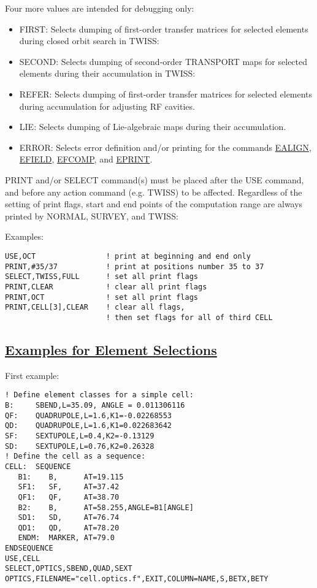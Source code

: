 Four more values are intended for debugging only: 
\begin{itemize}
   \item FIRST: Selects dumping of first-order transfer matrices for
     selected elements during closed orbit search in TWISS:  
   \item SECOND: Selects dumping of second-order TRANSPORT maps for
     selected elements during their accumulation in TWISS:  
   \item REFER: Selects dumping of first-order transfer matrices for
     selected elements during accumulation for adjusting RF cavities.  
   \item LIE: Selects dumping of Lie-algebraic maps during their accumulation. 
   \item ERROR: Selects error definition and/or printing for the
     commands \href{error_align.html}{EALIGN},
     \href{error_field.html}{EFIELD},  \href{error_field.html}{EFCOMP},
     and  \href{error_print.html}{EPRINT}.  
\end{itemize} 

PRINT and/or SELECT command(s) must be placed after the USE command, and
before any action command (e.g. TWISS) to be affected. Regardless of the
setting of print flags, start and end points of the computation range
are always printed by NORMAL, SURVEY, and TWISS:  

 Examples: 
\begin{verbatim}
USE,OCT                ! print at beginning and end only
PRINT,#35/37           ! print at positions number 35 to 37
SELECT,TWISS,FULL      ! set all print flags
PRINT,CLEAR            ! clear all print flags
PRINT,OCT              ! set all print flags
PRINT,CELL[3],CLEAR    ! clear all flags,
                       ! then set flags for all of third CELL
\end{verbatim}

\subsection{\href{example}{Examples for Element Selections}} 

First example: 
\begin{verbatim}
! Define element classes for a simple cell:
B:     SBEND,L=35.09, ANGLE = 0.011306116
QF:    QUADRUPOLE,L=1.6,K1=-0.02268553
QD:    QUADRUPOLE,L=1.6,K1=0.022683642
SF:    SEXTUPOLE,L=0.4,K2=-0.13129
SD:    SEXTUPOLE,L=0.76,K2=0.26328
! Define the cell as a sequence:
CELL:  SEQUENCE
   B1:    B,      AT=19.115
   SF1:   SF,     AT=37.42
   QF1:   QF,     AT=38.70
   B2:    B,      AT=58.255,ANGLE=B1[ANGLE]
   SD1:   SD,     AT=76.74
   QD1:   QD,     AT=78.20
   ENDM:  MARKER, AT=79.0
ENDSEQUENCE
USE,CELL
SELECT,OPTICS,SBEND,QUAD,SEXT
OPTICS,FILENAME="cell.optics.f",EXIT,COLUMN=NAME,S,BETX,BETY
\end{verbatim} 


